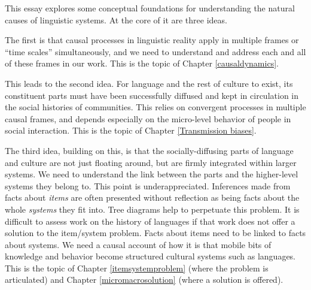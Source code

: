 


This essay explores some conceptual foundations for understanding the natural causes of linguistic systems. At the core of it are three ideas. 

The first is that causal processes in linguistic reality apply in multiple frames or ``time scales'' simultaneously, and we need to understand and address each and all of these frames in our work. This is the topic of Chapter \ref{causaldynamics}. 

This leads to the second idea. For language and the rest of culture to exist, its constituent parts must have been successfully diffused and kept in circulation in the social histories of communities. This relies on convergent processes in multiple causal frames, and depends especially on the micro-level behavior of people in social interaction. This is the topic of Chapter \ref{Transmission biases}. 

The third idea, building on this, is that the socially-diffusing parts of language and culture are not just floating around, but are firmly integrated within larger systems. We need to understand the link between the parts and the higher-level systems they belong to. This point is underappreciated. Inferences made from facts about \textit{items} are often presented without reflection as being facts about the whole \textit{systems} they fit into. Tree diagrams help to perpetuate this problem. It is difficult to assess work on the history of languages if that work does not offer a solution to the item/system problem. Facts about items need to be linked to facts about systems. We need a causal account of how it is that mobile bits of knowledge and behavior become structured cultural systems such as languages. This is the topic of Chapter \ref{itemsystemproblem} (where the problem is articulated) and Chapter \ref{micromacrosolution} (where a solution is offered). 

